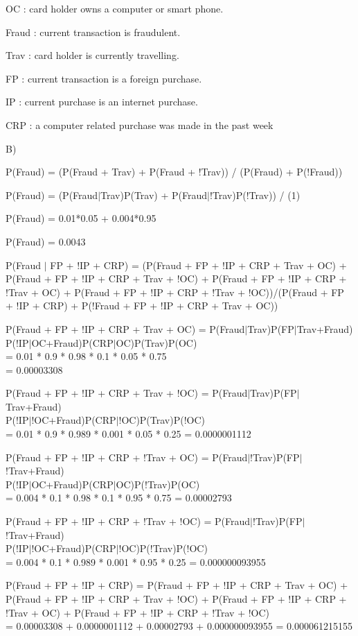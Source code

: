 \documentclass{article}
\begin{document}
OC : card holder owns a computer or smart phone.

Fraud : current transaction is fraudulent.

Trav : card holder is currently travelling.

FP : current transaction is a foreign purchase.

IP : current purchase is an internet purchase.

CRP : a computer related purchase was made in the past week




B)

	P(Fraud) = (P(Fraud + Trav) + P(Fraud + !Trav)) / (P(Fraud) + P(!Fraud))
	
	P(Fraud) = (P(Fraud$|$Trav)P(Trav) + P(Fraud$|$!Trav)P(!Trav)) / (1)
	
	P(Fraud) = 0.01*0.05 + 0.004*0.95
	
	P(Fraud) = 0.0043
	
	P(Fraud $|$ FP + !IP + CRP) = (P(Fraud + FP + !IP + CRP + Trav + OC) + P(Fraud + FP + !IP + CRP + Trav + !OC) + P(Fraud + FP + !IP + CRP + !Trav + OC) + P(Fraud + FP + !IP + CRP + !Trav + !OC))/(P(Fraud + FP + !IP + CRP) + P(!Fraud + FP + !IP + CRP + Trav + OC))
	
        P(Fraud + FP + !IP + CRP + Trav + OC) = P(Fraud$|$Trav)P(FP$|$Trav+Fraud)\\P(!IP$|$OC+Fraud)P(CRP$|$OC)P(Trav)P(OC)\\ = 0.01 * 0.9 * 0.98 * 0.1 * 0.05 * 0.75\\ = 0.00003308
	
	P(Fraud + FP + !IP + CRP + Trav + !OC) = P(Fraud$|$Trav)P(FP$|$Trav+Fraud)\\P(!IP$|$!OC+Fraud)P(CRP$|$!OC)P(Trav)P(!OC)\\ = 0.01 * 0.9 * 0.989 * 0.001 * 0.05 * 0.25 = 0.0000001112
	
	P(Fraud + FP + !IP + CRP + !Trav + OC) = P(Fraud$|$!Trav)P(FP$|$!Trav+Fraud)\\P(!IP$|$OC+Fraud)P(CRP$|$OC)P(!Trav)P(OC)\\ = 0.004 * 0.1 * 0.98 * 0.1 * 0.95 * 0.75 = 0.00002793
	
	P(Fraud + FP + !IP + CRP + !Trav + !OC) = P(Fraud$|$!Trav)P(FP$|$!Trav+Fraud)\\P(!IP$|$!OC+Fraud)P(CRP$|$!OC)P(!Trav)P(!OC)\\ = 0.004 * 0.1 * 0.989 * 0.001 * 0.95 * 0.25 = 0.000000093955
	
	P(Fraud + FP + !IP + CRP) = P(Fraud + FP + !IP + CRP + Trav + OC) + P(Fraud + FP + !IP + CRP + Trav + !OC) + P(Fraud + FP + !IP + CRP + !Trav + OC) + P(Fraud + FP + !IP + CRP + !Trav + !OC)\\ = 0.00003308 + 0.0000001112 + 0.00002793 + 0.000000093955 = 0.000061215155
		
\end{document}
